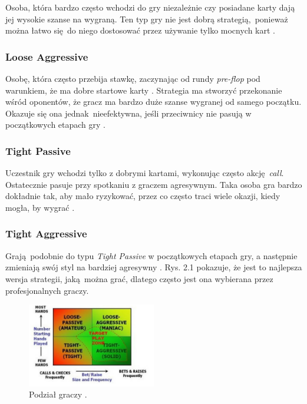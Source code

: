 \documentclass[12pt,oneside,a4paper]{report}
\begin{document}
Osoba, która bardzo często wchodzi do gry niezależnie czy posiadane karty dają jej
wysokie szanse na wygraną. 
Ten typ gry nie jest dobrą strategią, ponieważ można łatwo się do niego 
dostosować przez używanie tylko mocnych kart \cite{class}.

\subsubsection{Loose Aggressive}

Osobę, która często przebija stawkę, zaczynając od rundy \emph{pre-flop} pod
warunkiem, że ma dobre startowe karty \cite{class}. Strategia ma stworzyć przekonanie wśród
oponentów, że gracz ma bardzo duże szanse wygranej od samego początku. 
Okazuje się ona jednak nieefektywna, jeśli przeciwnicy nie pasują w początkowych etapach gry
\cite{class}. 

\subsubsection{Tight Passive}

Uczestnik gry wchodzi tylko z dobrymi kartami, wykonując często akcję \emph{call}. 
Ostatecznie pasuje przy spotkaniu z graczem agresywnym. Taka osoba gra bardzo dokładnie tak, aby
mało ryzykować, przez co często traci wiele okazji, kiedy
mogła, by wygrać \cite{class}. 

\subsubsection{Tight Aggressive}

Grają podobnie do typu \emph{Tight Passive} w początkowych etapach gry, a następnie zmieniają swój
styl na bardziej agresywny \cite{class}. Rys. 2.1 pokazuje, że jest to najlepsza wersja strategii, jaką można
grać, dlatego często jest ona wybierana przez profesjonalnych graczy.

\vspace{1cm}


\begin{figure}[h!]
            \center
           \includegraphics[width=0.5\textwidth]{./img/class.pdf}
           \caption{Podział graczy \cite{class}.}
\end{figure}
\end{document}
